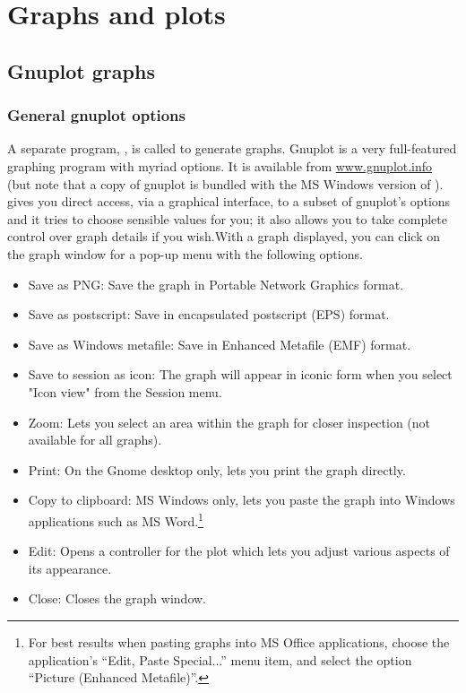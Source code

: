 \chapter{Graphs and plots}
\label{chap-graphs}



\section{Gnuplot graphs}
\label{gnuplot-graphs}



\subsection{General gnuplot options}
\label{gnuplot-opts}

A separate program, , is
      called to generate graphs. Gnuplot is a very full-featured
      graphing program with myriad options. It is available from
      \href{http://www.gnuplot.info/}{www.gnuplot.info}
      (but note that a copy of gnuplot is bundled with the MS Windows
      version of ).
       gives you direct access, via a
      graphical interface, to a subset of gnuplot's options and it
      tries to choose sensible values for you; it also allows you to
      take complete control over graph details if you wish.With a graph displayed, you can click on the graph window
      for a pop-up menu with the following options.
\begin{itemize}
\item \textsf{Save as PNG}: Save the
	  graph in Portable Network Graphics format.
\item \textsf{Save as postscript}:
	  Save in encapsulated postscript (EPS) format.
\item \textsf{Save as Windows
	    metafile}: Save in Enhanced Metafile (EMF)
	  format.
\item \textsf{Save to session as
	    icon}: The graph will appear in iconic form
	  when you select "Icon view" from the Session menu.
\item \textsf{Zoom}: Lets you select
	  an area within the graph for closer inspection (not
	  available for all graphs).
\item \textsf{Print}: On the Gnome
	  desktop only, lets you print the graph directly.
\item \textsf{Copy to clipboard}: MS
	  Windows only, lets you paste the graph into Windows
	  applications such as MS Word.\footnote{For best
	      results when pasting graphs into MS Office applications,
	      choose the application's ``Edit, Paste
		Special...'' menu item, and select the option
	      ``Picture (Enhanced Metafile)''.}
\item \textsf{Edit}: Opens a
	  controller for the plot which lets you adjust various
	  aspects of its appearance.
\item \textsf{Close}: Closes the
	  graph window.
\end{itemize}



